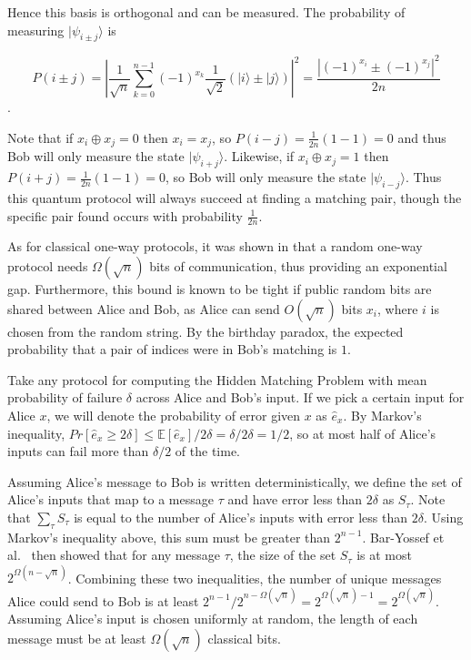\documentclass[a4paper]{article}
\begin{document}
        Hence this basis is orthogonal and can be measured. The probability of measuring $|\psi_{i \pm j}\rangle$ is

        $$P(i\pm j) = \left|\frac{1}{\sqrt{n}}\sum_{k=0}^{n-1}(-1)^{x_k}\frac{1}{\sqrt{2}}(|i\rangle \pm |j\rangle)\right|^2 = \frac{|(-1)^{x_i} \pm (-1)^{x_j}|^2}{2n}$$.

        Note that if $x_i \oplus x_j = 0$ then $x_i = x_j$, so $P(i-j) = \frac{1}{2n}(1-1) = 0$ and thus Bob will only measure the state $|\psi_{i+j}\rangle$. Likewise, if $x_i \oplus x_j = 1$ then $P(i+j) = \frac{1}{2n}(1-1) = 0$, so Bob will only measure the state $|\psi_{i-j}\rangle$. Thus this quantum protocol will always succeed at finding a matching pair, though the specific pair found occurs with probability $\frac{1}{2n}$.

        As for classical one-way protocols, it was shown in \cite{doi:10.1137/060651835} that a random one-way protocol needs $\Omega(\sqrt{n})$ bits of communication, thus providing an exponential gap. Furthermore, this bound is known to be tight if public random bits are shared between Alice and Bob, as Alice can send $O(\sqrt{n})$ bits $x_i$, where $i$ is chosen from the random string. By the birthday paradox, the expected probability that a pair of indices were in Bob's matching is $1$.

        Take any protocol for computing the Hidden Matching Problem with mean probability of failure $\delta$ across Alice and Bob's input. If we pick a certain input for Alice $x$, we will denote the probability of error given $x$ as $\hat{e}_x$. By Markov's inequality, $Pr[\hat{e}_x \geq 2\delta] \leq \mathbb{E}[\hat{e}_x]/2\delta = \delta/2\delta = 1/2$, so at most half of Alice's inputs can fail more than $\delta/2$ of the time.

        Assuming Alice's message to Bob is written deterministically, we define the set of Alice's inputs that map to a message $\tau$ and have error less than $2\delta$ as $S_{\tau}$. Note that $\sum_{\tau}S_{\tau}$ is equal to the number of Alice's inputs with error less than $2\delta$. Using Markov's inequality above, this sum must be greater than $2^{n-1}$. Bar-Yossef et al.~ then showed that for any message $\tau$, the size of the set $S_{\tau}$ is at most $2^{\Omega(n - \sqrt{n})}$. Combining these two inequalities, the number of unique messages Alice could send to Bob is at least $2^{n - 1}/2^{n - \Omega(\sqrt{n})} = 2^{\Omega(\sqrt{n}) - 1} = 2^{\Omega(\sqrt{n})}$. Assuming Alice's input is chosen uniformly at random, the length of each message must be at least $\Omega(\sqrt{n})$ classical bits.
\end{document}
